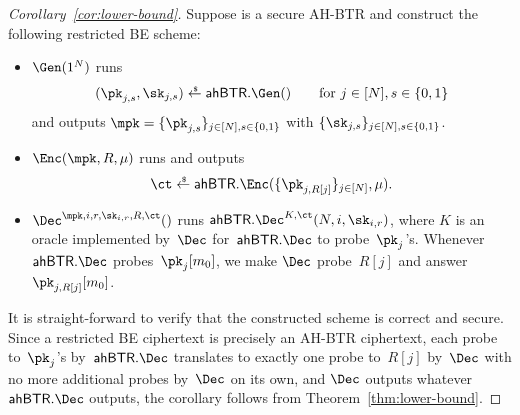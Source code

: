 \begin{proof}
[%
Corollary~\ref{cor:lower-bound}]
Suppose
is a secure AH-BTR and
construct the following restricted BE scheme:
\begin{itemize}
\item $\Gen(1^N)$ runs
\begin{align*}
(\pk_{j,s},\sk_{j,s})\draws\AHBTR.\Gen()\qquad\textup{for }j\in[N],s\in\bit
\end{align*}
and outputs ${\mpk=\{\pk_{j,s}\}_{j\in[N],s\in\bit}}$ with $\{\sk_{j,s}\}_{j\in[N],s\in\bit}$.
\item $\Enc(\mpk,R,\mu)$ runs and outputs
\begin{align*}
\ct\draws\AHBTR.\Enc(\{\pk_{j,R[j]}\}_{j\in[N]},\mu).
\end{align*}
\item $\Dec^{\mpk,i,r,\sk_{i,r},R,\ct}()$
runs $\AHBTR.\Dec^{K,\ct}(N,i,\sk_{i,r})$,
where $K$ is an oracle implemented by~$\Dec$ for~$\AHBTR.\Dec$ to probe~$\pk_j$'s.
Whenever $\AHBTR.\Dec$ probes~$\pk_j[m_0]$,
we make $\Dec$ probe~$R[j]$ and answer~$\pk_{j,R[j]}[m_0]$.
\end{itemize}
It is straight-forward to verify that the constructed scheme is correct and secure.
Since
a restricted BE ciphertext is precisely an AH-BTR ciphertext,
each probe to~$\pk_j$'s by~$\AHBTR.\Dec$ translates to exactly one probe to~$R[j]$ by~$\Dec$ with no more additional probes by~$\Dec$ on its own, and
$\Dec$ outputs whatever $\AHBTR.\Dec$ outputs,
the corollary follows from Theorem~\ref{thm:lower-bound}.
\end{proof}
